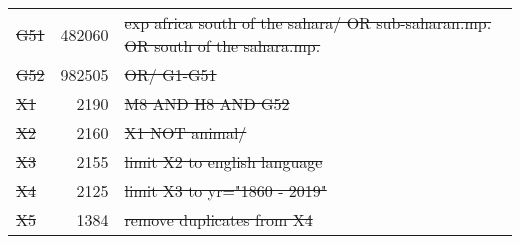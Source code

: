 \begin{longtable}{lrl}
  \st{G51} & \num{482060} & \st{exp africa south of the sahara/ OR sub-saharan.mp. OR south of the sahara.mp.}        \\
  \st{G52} & \num{982505} & \st{OR/ G1-G51}                                                                           \\
  \midrule
   \st{X1} &   \num{2190} & \st{M8 AND H8 AND G52}            \\
	 \st{X2} &   \num{2160} & \st{X1 NOT animal/}               \\
	 \st{X3} &   \num{2155} & \st{limit X2 to english language} \\
	 \st{X4} &   \num{2125} & \st{limit X3 to yr="1860 - 2019"} \\
	 \st{X5} &   \num{1384} & \st{remove duplicates from X4}    \\
\end{longtable}
\endgroup